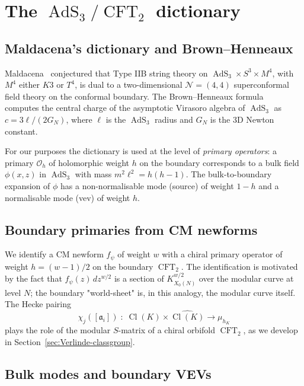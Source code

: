 \documentclass[11pt,a4paper]{amsart}
\theoremstyle{definition}
\DeclareMathOperator{\Cl}{Cl}
\DeclareMathOperator{\AdS}{AdS}
\DeclareMathOperator{\CFT}{CFT}
\newcommand{\fa}{\mathfrak{a}}
\newcommand{\Ocal}{\mathcal{O}}
\newcommand{\Ncal}{\mathcal{N}}
\begin{document}
\section{The $\AdS_3/\CFT_2$ dictionary}\label{sec:AdS3-CFT2}

\subsection{Maldacena's dictionary and Brown--Henneaux}\label{ss:Maldacena-BH}

Maldacena~\cite{Maldacena1997} conjectured that Type IIB string theory on
$\AdS_3 \times S^3 \times M^4$, with $M^4$ either $K3$ or $T^4$, is dual to a
two-dimensional $\Ncal = (4,4)$ superconformal field theory on the conformal boundary.
The Brown--Henneaux formula~\cite{BrownHenneaux1986} computes the central charge of the
asymptotic Virasoro algebra of $\AdS_3$ as $c = 3\ell/(2 G_N)$, where $\ell$ is the
$\AdS_3$ radius and $G_N$ is the 3D Newton constant.

For our purposes the dictionary is used at the level of \emph{primary operators}:
a primary $\Ocal_h$ of holomorphic weight $h$ on the boundary corresponds to a bulk
field $\phi(x,z)$ in $\AdS_3$ with mass $m^2 \ell^2 = h(h-1)$. The bulk-to-boundary
expansion of $\phi$ has a non-normalisable mode (source) of weight $1 - h$ and a
normalisable mode (vev) of weight $h$.

\subsection{Boundary primaries from CM newforms}\label{ss:CM-as-primaries}

We identify a CM newform $f_\psi$ of weight $w$ with a chiral primary operator of
weight $h = (w-1)/2$ on the boundary $\CFT_2$. The identification is motivated by the
fact that $f_\psi(z)\, dz^{w/2}$ is a section of $K_{X_0(N)}^{w/2}$ over the modular
curve at level $N$; the boundary "world-sheet" is, in this analogy, the modular curve
itself. The Hecke pairing
\[
  \chi_j([\fa_i]) \;:\; \Cl(K) \times \widehat{\Cl(K)} \to \mu_{h_K}
\]
plays the role of the modular $S$-matrix of a chiral orbifold $\CFT_2$, as we develop
in Section~\ref{sec:Verlinde-classgroup}.

\subsection{Bulk modes and boundary VEVs}\label{ss:bulk-boundary-modes}
\end{document}
